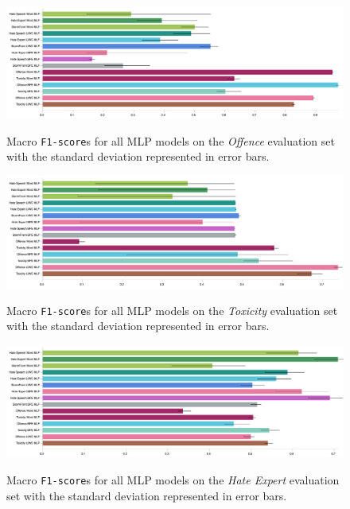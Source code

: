 \begin{figure}
\begin{minipage}{\textwidth}
    \centering
    \includegraphics[width=\textwidth]{all_mlp_davidson_test.pdf}
    \caption{Macro \texttt{F1-score}s for all MLP models on the \textit{Offence} evaluation set with the standard deviation represented in error bars.}
    \label{fig:davidson_mlp_test}
  \vfill
    \includegraphics[width=\textwidth]{all_mlp_wulczyn_test.pdf}
    \caption{Macro \texttt{F1-score}s for all MLP models on the \textit{Toxicity} evaluation set with the standard deviation represented in error bars.}
    \label{fig:wulczyn_mlp_test}
  \vfill
    \includegraphics[width=\textwidth]{all_mlp_waseem_test.pdf}
    \caption{Macro \texttt{F1-score}s for all MLP models on the \textit{Hate Expert} evaluation set with the standard deviation represented in error bars.}
    \label{fig:waseem_mlp_test}
\end{minipage}
\end{figure}

